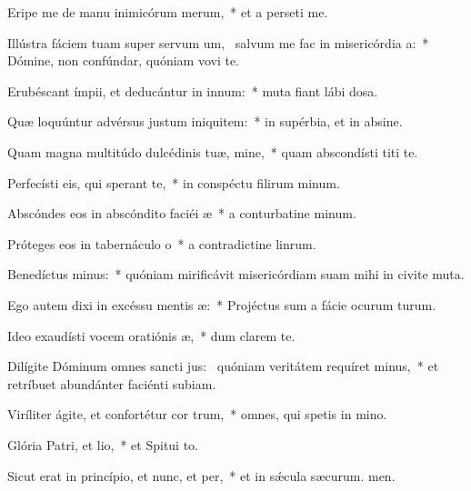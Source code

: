\item Eripe me de manu inimicórum merum,~* et a perseti me.
\item Illústra fáciem tuam super servum um,~\pscross{} salvum me fac in misericórdia a:~* Dómine, non confúndar, quóniam vovi te.
\item Erubéscant ímpii, et deducántur in innum:~* muta fiant lábi dosa.
\item Quæ loquúntur advérsus justum iniquitem:~* in supérbia, et in absine.
\item Quam magna multitúdo dulcédinis tuæ, mine,~* quam abscondísti titi te.
\item Perfecísti eis, qui sperant  te,~* in conspéctu filirum minum.
\item Abscóndes eos in abscóndito faciéi æ~* a conturbatine minum.
\item Próteges eos in tabernáculo o~* a contradictine linrum.
\item Benedíctus minus:~* quóniam mirificávit misericórdiam suam mihi in civite muta.
\item Ego autem dixi in excéssu mentis æ:~* Projéctus sum a fácie ocurum turum.
\item Ideo exaudísti vocem oratiónis æ,~* dum clarem  te.
\item Dilígite Dóminum omnes sancti jus:~\pscross{} quóniam veritátem requíret minus,~* et retríbuet abundánter faciénti subiam.
\item Viríliter ágite, et confortétur cor trum,~* omnes, qui spetis in mino.
\item Glória Patri, et lio,~* et Spitui to.
\item Sicut erat in princípio, et nunc, et per,~* et in sǽcula sæcurum. men.
